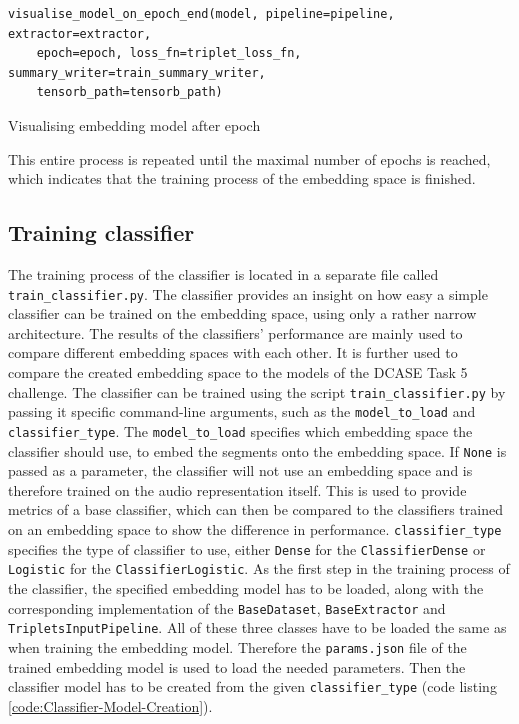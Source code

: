 \begin{code}[H]
\begin{verbatim}
visualise_model_on_epoch_end(model, pipeline=pipeline, extractor=extractor, 
    epoch=epoch, loss_fn=triplet_loss_fn, summary_writer=train_summary_writer, 
    tensorb_path=tensorb_path)
\end{verbatim}
\caption{Visualising embedding model after epoch}
\label{code:Visualising-Embedding-Model}
\end{code}
\noindent
This entire process is repeated until the maximal number of epochs is reached, which indicates that the training process of the embedding space is finished.

\subsection{Training classifier}
\label{sub:Training-Classifier}
The training process of the classifier is located in a separate file called \texttt{train\_classifier.py}. The classifier provides an insight on how easy a simple classifier can be trained on the embedding space, using only a rather narrow architecture. The results of the classifiers' performance are mainly used to compare different embedding spaces with each other. It is further used to compare the created embedding space to the models of the \gls{DCASE} Task 5 challenge.
\newline
\newline
The classifier can be trained using the script \texttt{train\_classifier.py} by passing it specific command-line arguments, such as the \texttt{model\_to\_load} and \texttt{classifier\_type}. The \texttt{model\_to\_load} specifies which embedding space the classifier should use, to embed the segments onto the embedding space. If \texttt{None} is passed as a parameter, the classifier will not use an embedding space and is therefore trained on the audio representation itself. This is used to provide metrics of a \flqq base classifier\frqq, which can then be compared to the classifiers trained on an embedding space to show the difference in performance. \texttt{classifier\_type} specifies the type of classifier to use, either \texttt{Dense} for the \texttt{ClassifierDense} or \texttt{Logistic} for the \texttt{ClassifierLogistic}.
\newline
\newline
As the first step in the training process of the classifier, the specified embedding model has to be loaded, along with the corresponding implementation of the \texttt{BaseDataset}, \texttt{BaseExtractor} and \texttt{TripletsInputPipeline}. All of these three classes have to be loaded the same as when training the embedding model. Therefore the \texttt{params.json} file of the trained embedding model is used to load the needed parameters. Then the classifier model has to be created from the given \texttt{classifier\_type} (code listing \ref{code:Classifier-Model-Creation}).

